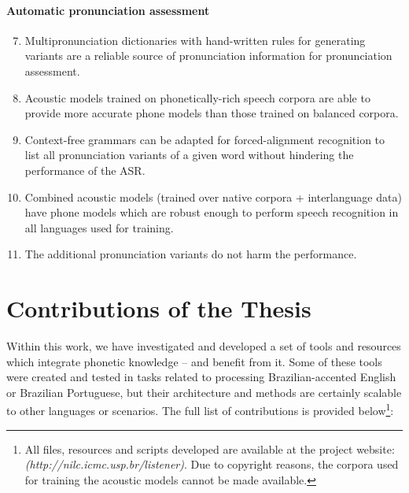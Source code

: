 \paragraph*{Automatic pronunciation assessment}
  \begin{enumerate}
    \setcounter{enumi}{6}
    \item Multipronunciation dictionaries with hand-written rules for generating variants are a reliable source of pronunciation information for pronunciation assessment.
    \item Acoustic models trained on phonetically-rich speech corpora are able to provide more accurate phone models than those trained on balanced corpora.
    \item Context-free grammars can be adapted for forced-alignment recognition to list all pronunciation variants of a given word without hindering the performance of the \ac{ASR}.
    \item Combined acoustic models (trained over native corpora + interlanguage data) have phone models which are robust enough to perform speech recognition in all languages used for training.
    \item The additional pronunciation variants do not harm the performance.
  \end{enumerate}

  
\section*{Contributions of the Thesis} 

Within this work, we have investigated and developed a set of tools and resources which integrate phonetic knowledge -- and benefit from it. Some of these tools were created and tested in tasks related to processing Brazilian-accented English or Brazilian Portuguese, but their architecture and methods are certainly scalable to other languages or scenarios. The full list of contributions is provided below\footnote{All files, resources and scripts developed are available at the project website: \emph{(http://nilc.icmc.usp.br/listener)}. Due to copyright reasons, the corpora used for training the acoustic models cannot be made available.}:

